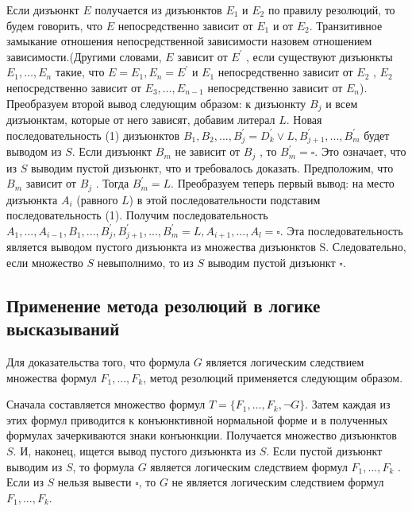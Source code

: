 \documentclass[12pt, a4paper]{article}
\begin{document}
	 \par Если дизъюнкт $E$ получается из дизъюнктов $E_{1}$ и $E_{2}$ по правилу резолюций, то будем говорить, что $E$ непосредственно зависит от $E_{1}$ и от $E_{2}$. Транзитивное замыкание отношения непосредственной зависимости назовем отношением зависимости.(Другими словами, $E$ зависит от $E^\prime$ , если существуют дизъюнкты $E_{1} , … , E_{n}$ такие, что $E = E_{1} , E_{n} = E^\prime$ и $E_{1}$ непосредственно зависит от $E_{2}$ , $E_{2}$ непосредственно зависит от $E_{3} , … , E_{n-1}$ непосредственно зависит от $E_{n}$). Преобразуем второй вывод следующим образом: к дизъюнкту $B_{j}$ и всем дизъюнктам, которые от него зависят, добавим литерал $L$. Новая последовательность (1) дизъюнктов $B_{1}, B_{2}, ... , B_{j}^\prime =  D_{k}^\prime \lor L, B_{j+1}^\prime , ... , B_{m}^\prime $ будет выводом из $S$. Если дизъюнкт $B_{m}$ не зависит от $B_{j}$ , то $B_{m}^\prime = \square$. Это означает, что из $S$ выводим пустой дизъюнкт, что и требовалось доказать. Предположим, что $B_{m}$ зависит от $B_{j}$ . Тогда $B_{m}^\prime = L$. Преобразуем теперь первый вывод: на место дизъюнкта $A_{i}$ (равного $L$) в этой последовательности подставим последовательность (1). Получим последовательность $A_{1}, ... , A_{i-1}, B_{1}, ... , B_{j}^\prime , B_{j+1}^\prime, ... , B_{m}^\prime = L , A_{i+1}, ... , A_{l} = \square$. Эта последовательность является выводом пустого дизъюнкта из множества дизъюнктов S. Следовательно, если множество $S$ невыполнимо, то из $S$ выводим пустой дизъюнкт $\square$. 
	  \begin{center}
	 	\subsection{Применение метода резолюций в логике высказываний}
	 \end{center} 
	 \par Для доказательства того, что формула $G$ является логическим следствием множества формул $F_{1}, ... , F_{k}$, метод резолюций применяется следующим образом. 
	 \par Сначала составляется множество формул $T = \{F_{1} , …, F_{k} ,\neg G\}$. Затем каждая из этих формул приводится к конъюнктивной нормальной форме и в полученных формулах зачеркиваются знаки конъюнкции. Получается множество дизъюнктов $S$. И, наконец, ищется вывод пустого дизъюнкта из $S$. Если пустой дизъюнкт выводим из $S$, то формула $G$ является логическим следствием формул $F_{1}, ... , F_{k}$ . Если из $S$ нельзя вывести $\square$, то $G$ не является логическим следствием формул $F_{1}, ... , F_{k}$.
\end{document}
